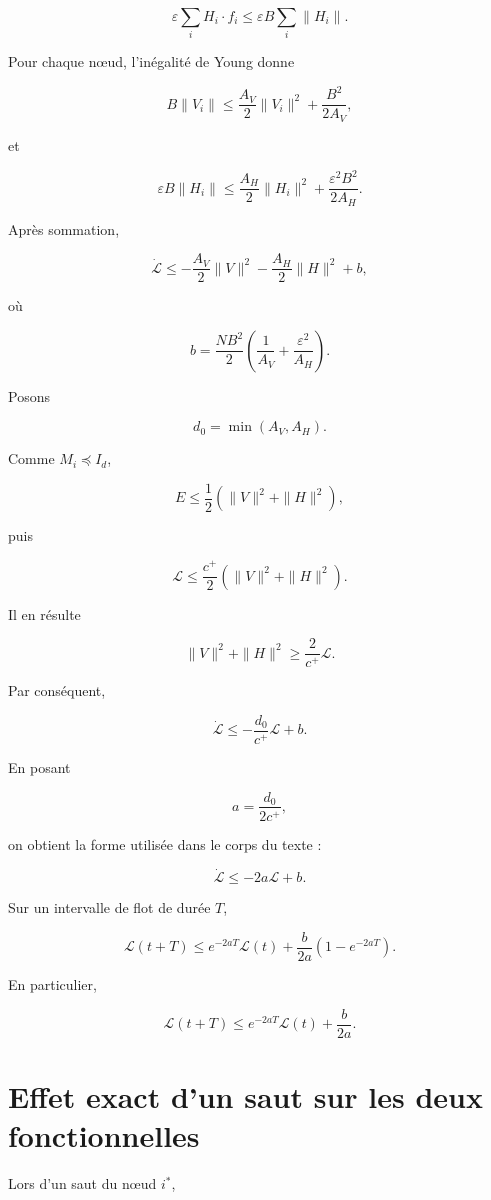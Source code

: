 \[
\varepsilon\sum_iH_i\cdot f_i
\leq
\varepsilon B\sum_i\|H_i\|.
\]

Pour chaque nœud, l'inégalité de Young donne

\[
B\|V_i\|
\leq
\frac{A_V}{2}\|V_i\|^2
+
\frac{B^2}{2A_V},
\]

et

\[
\varepsilon B\|H_i\|
\leq
\frac{A_H}{2}\|H_i\|^2
+
\frac{\varepsilon^2B^2}{2A_H}.
\]

Après sommation,

\[
\dot{\mathcal L}
\leq
-\frac{A_V}{2}\|V\|^2
-\frac{A_H}{2}\|H\|^2
+b,
\]

où

\[
b
=
\frac{NB^2}{2}
\left(
\frac{1}{A_V}
+
\frac{\varepsilon^2}{A_H}
\right).
\]

Posons

\[
d_0=\min(A_V,A_H).
\]

Comme \(M_i\preceq I_d\),

\[
E
\leq
\frac12
\left(
\|V\|^2+\|H\|^2
\right),
\]

puis

\[
\mathcal L
\leq
\frac{c^{+}}{2}
\left(
\|V\|^2+\|H\|^2
\right).
\]

Il en résulte

\[
\|V\|^2+\|H\|^2
\geq
\frac{2}{c^{+}}\mathcal L.
\]

Par conséquent,

\[
\dot{\mathcal L}
\leq
-\frac{d_0}{c^{+}}\mathcal L+b.
\]

En posant

\[
a=\frac{d_0}{2c^{+}},
\]

on obtient la forme utilisée dans le corps du texte :

\[
\boxed{
\dot{\mathcal L}
\leq
-2a\mathcal L+b
}.
\]

Sur un intervalle de flot de durée \(T\),

\[
\boxed{
\mathcal L(t+T)
\leq
e^{-2aT}\mathcal L(t)
+
\frac{b}{2a}
\left(
1-e^{-2aT}
\right)
}.
\]

En particulier,

\[
\mathcal L(t+T)
\leq
e^{-2aT}\mathcal L(t)
+
\frac{b}{2a}.
\]

\section{Effet exact d'un saut sur les deux fonctionnelles}
\label{annexe-energie-effet-saut}

Lors d'un saut du nœud \(i^\ast\),

